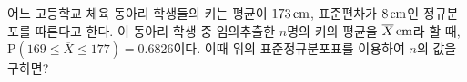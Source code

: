 \noindent\begin{minipage}[t]{0.58\linewidth}\vspace{0pt}\raggedright 어느 고등학교 체육 동아리 학생들의 키는 평균이 $173\mkern3mu \mathrm{cm}$, 표준편차가 $8\mkern3mu \mathrm{cm}$인 정규분포를 따른다고 한다. 이 동아리 학생 중 임의추출한 $n$명의 키의 평균을 $\overline{X}\mkern3mu \mathrm{cm}$라 할 때, $\mathrm{P}(169\le\overline{X}\le 177)=0.6826$이다. 이때 위의 표준정규분포표를 이용하여 $n$의 값을 구하면?\end{minipage}\hfill\begin{minipage}[t]{0.4\linewidth}\vspace{0pt}\centering \resizebox{\ifdim\width>\linewidth\linewidth\else\width\fi}{!}{}\end{minipage}\par
{}
